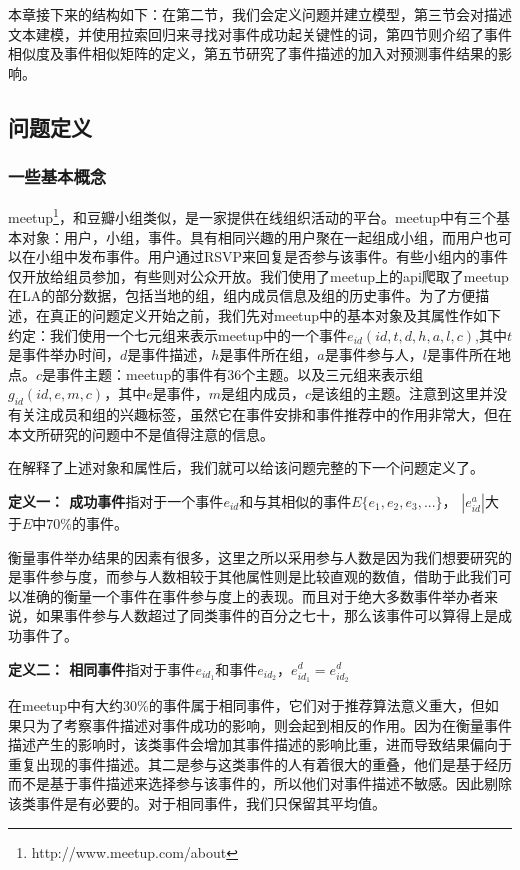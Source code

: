 \documentclass[12pt]{template}
\begin{document}
本章接下来的结构如下：在第二节，我们会定义问题并建立模型，第三节会对描述文本建模，并使用拉索回归来寻找对事件成功起关键性的词，第四节则介绍了事件相似度及事件相似矩阵的定义，第五节研究了事件描述的加入对预测事件结果的影响。




\subsection{问题定义}
\subsubsection{一些基本概念}
meetup\footnote{http://www.meetup.com/about}，和豆瓣小组类似，是一家提供在线组织活动的平台。meetup中有三个基本对象：用户，小组，事件。具有相同兴趣的用户聚在一起组成小组，而用户也可以在小组中发布事件。用户通过RSVP来回复是否参与该事件。有些小组内的事件仅开放给组员参加，有些则对公众开放。我们使用了meetup上的api爬取了meetup在LA的部分数据，包括当地的组，组内成员信息及组的历史事件。为了方便描述，在真正的问题定义开始之前，我们先对meetup中的基本对象及其属性作如下约定：我们使用一个七元组来表示meetup中的一个事件\(e_{id}(id,t,d,h,a,l,c)\),其中\(t\)是事件举办时间，\(d\)是事件描述，\(h\)是事件所在组，\(a\)是事件参与人，\(l\)是事件所在地点。\(c\)是事件主题：meetup的事件有36个主题。以及三元组来表示组\(g_{id}(id,e,m,c)\)，其中\(e\)是事件，\(m\)是组内成员，\(c\)是该组的主题。注意到这里并没有关注成员和组的兴趣标签，虽然它在事件安排和事件推荐中的作用非常大，但在本文所研究的问题中不是值得注意的信息。

在解释了上述对象和属性后，我们就可以给该问题完整的下一个问题定义了。

\textbf{定义一： 成功事件}指对于一个事件\(e_{id}\)和与其相似的事件\(E\{e_1,e_2,e_3,...\}\)，
\(|e_{id}^a|\)大于\(E\)中\(70\)\%的事件。

衡量事件举办结果的因素有很多，这里之所以采用参与人数是因为我们想要研究的是事件参与度，而参与人数相较于其他属性则是比较直观的数值，借助于此我们可以准确的衡量一个事件在事件参与度上的表现。而且对于绝大多数事件举办者来说，如果事件参与人数超过了同类事件的百分之七十，那么该事件可以算得上是成功事件了。

\textbf{定义二： 相同事件}指对于事件\(e_{id_1}\)和事件\(e_{id_2}\)，\(e_{id_1}^d=e_{id_2}^d\)

在meetup中有大约30\%的事件属于相同事件，它们对于推荐算法意义重大，但如果只为了考察事件描述对事件成功的影响，则会起到相反的作用。因为在衡量事件描述产生的影响时，该类事件会增加其事件描述的影响比重，进而导致结果偏向于重复出现的事件描述。其二是参与这类事件的人有着很大的重叠，他们是基于经历而不是基于事件描述来选择参与该事件的，所以他们对事件描述不敏感。因此剔除该类事件是有必要的。对于相同事件，我们只保留其平均值。
\end{document}
